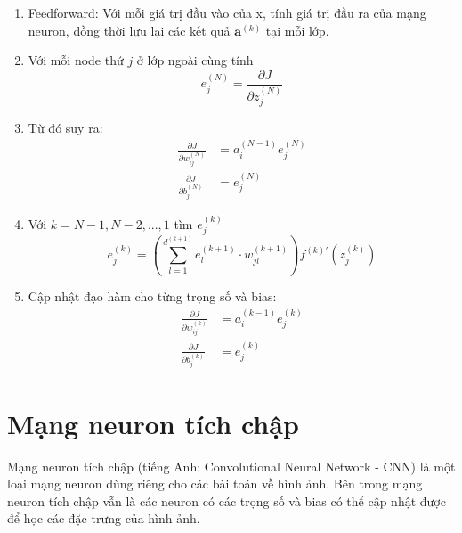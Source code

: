 \begin{enumerate}
	\item Feedforward: Với mỗi giá trị đầu vào của x, tính giá trị đầu ra của mạng neuron, đồng thời lưu lại các kết quả ${\boldsymbol{a}}^{(k)}$ tại mỗi lớp.
	\item Với mỗi node thứ $j$ ở lớp ngoài cùng tính
\begin{equation}
	{e_{j}^{(N)}}
	=
	\frac
		{ {\partial} J }
		{ {\partial} {z_{j}^{(N)}} }
\end{equation}
	\item Từ đó suy ra:
\begin{align*}
	\frac
		{ {\partial} J }
		{ {\partial} {w_{ij}^{(N)}} }
	&=
	{a_{i}^{(N-1)}}
	{e_{j}^{(N)}} \\
	\frac
		{ {\partial} J }
		{ {\partial} {b_{j}^{(N)}} }
	&=
	{ e_{j}^{(N)} }
\end{align*}
	\item Với $k=N-1,N-2,...,1$ tìm $e_{j}^{(k)}$
\begin{equation}
	e_{j}^{(k)}
	=
	\left( 
		{\sum_{l=1}^{d^{(k+1)}}}
		e_{l}^{(k+1)}
		{\cdot}
		w_{jl}^{(k+1)}
	\right) 
	{
		{f^{(k)'}} 
		\left( 
			{z_{j}^{(k)}} 
	 	\right)
	}
\end{equation}
	\item Cập nhật đạo hàm cho từng trọng số và bias:
\begin{align*}
	\frac
		{ {\partial} J }
		{ {\partial} {w_{ij}^{(k)}} }
	&=
	{a_{i}^{(k-1)}}
	{e_{j}^{(k)}} \\
	\frac
	{ {\partial} J }
		{ {\partial} {b_{j}^{(k)}} }
	&=
	{ e_{j}^{(k)} }
\end{align*}
\end{enumerate}
\section{Mạng neuron tích chập}
Mạng neuron tích chập\cite{cnn:2020:standford} (tiếng Anh: Convolutional Neural Network - CNN) là một loại mạng neuron dùng riêng cho các bài toán về hình ảnh. Bên trong mạng neuron tích chập vẫn là các neuron có các trọng số và bias có thể cập nhật được để học các đặc trưng của hình ảnh.

